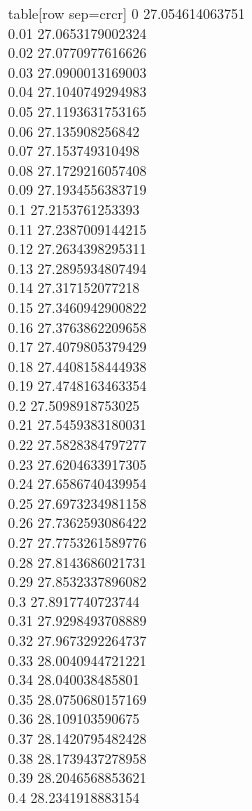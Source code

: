   table[row sep=crcr]{%
0	27.054614063751\\
0.01	27.0653179002324\\
0.02	27.0770977616626\\
0.03	27.0900013169003\\
0.04	27.1040749294983\\
0.05	27.1193631753165\\
0.06	27.135908256842\\
0.07	27.153749310498\\
0.08	27.1729216057408\\
0.09	27.1934556383719\\
0.1	27.2153761253393\\
0.11	27.2387009144215\\
0.12	27.2634398295311\\
0.13	27.2895934807494\\
0.14	27.317152077218\\
0.15	27.3460942900822\\
0.16	27.3763862209658\\
0.17	27.4079805379429\\
0.18	27.4408158444938\\
0.19	27.4748163463354\\
0.2	27.5098918753025\\
0.21	27.5459383180031\\
0.22	27.5828384797277\\
0.23	27.6204633917305\\
0.24	27.6586740439954\\
0.25	27.6973234981158\\
0.26	27.7362593086422\\
0.27	27.7753261589776\\
0.28	27.8143686021731\\
0.29	27.8532337896082\\
0.3	27.8917740723744\\
0.31	27.9298493708889\\
0.32	27.9673292264737\\
0.33	28.0040944721221\\
0.34	28.040038485801\\
0.35	28.0750680157169\\
0.36	28.109103590675\\
0.37	28.1420795482428\\
0.38	28.1739437278958\\
0.39	28.2046568853621\\
0.4	28.2341918883154\\
}
